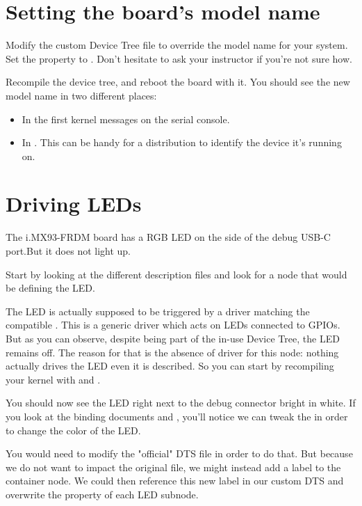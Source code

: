 \section{Setting the board's model name}

Modify the custom Device Tree file to override the model name for your
system. Set the  property to . Don't hesitate to ask your instructor if you're not sure how.

Recompile the device tree, and reboot the board with it. You should see
the new model name in two different places:

\begin{itemize}
\item In the first kernel messages on the serial console.
\item In . This can be
      handy for a distribution to identify the device it's running on.
\end{itemize}

\section{Driving LEDs}

The i.MX93-FRDM board has a RGB LED on the side of the debug USB-C port.But it does not light up.

Start by looking at the different description files and look for a node
that would be defining the LED.

The LED is actually supposed to be triggered by a driver matching
the compatible . This is a generic driver which acts on
LEDs connected to GPIOs. But as you can observe, despite being part of
the in-use Device Tree, the LED remains off. The reason for that is the
absence of driver for this node: nothing actually drives the LED even
it is described. So you can start by recompiling your kernel with
 and .

You should now see the LED right next to the debug connector bright in white. If
you look at the binding documents
 and
, you'll
notice we can tweak the  in order to change the
color of the LED.

You would need to modify the "official" DTS file in order to do that.
But because we do not want to impact the original file, we might instead
add a label to the  container node. We
could then reference this new label in our custom DTS and overwrite the
 property of each LED subnode.


